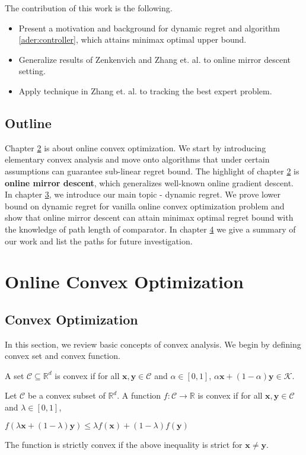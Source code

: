 \documentclass[12pt, a4paper]{report}
\begin{document}
The contribution of this work is the following.
\begin{itemize}
    \item Present a motivation and background for dynamic regret and algorithm \ref{ader:controller}, which attains minimax optimal upper bound. 
    \item Generalize results of Zenkenvich \cite{Zinkevich2003OnlineCP} and Zhang et. al. \cite{Zhang2018AdaptiveOL} to online mirror descent setting.
    \item Apply technique in Zhang et. al. \cite{Zhang2018AdaptiveOL} to tracking the best expert problem.
\end{itemize}



\section{Outline}
Chapter \hyperref[Chap2]{2} is about online convex optimization. We start by introducing elementary convex analysis and move onto algorithms that under certain assumptions can guarantee sub-linear regret bound. The highlight of chapter \hyperref[Chap2]{2} is \textbf{online mirror descent}, which generalizes well-known online gradient descent. In chapter \hyperref[Chap3]{3}, we introduce our main topic - dynamic regret. We prove lower bound on dynamic regret for vanilla online convex optimization problem and show that online mirror descent can attain minimax optimal regret bound with the knowledge of path length of comparator.  
In chapter \hyperref[Chap4]{4} we give a summary of our work and list the paths for future investigation.

\chapter{Online Convex Optimization}
\label{Chap2}
\section{Convex Optimization}
In this section, we review basic concepts of convex analysis. We begin by defining convex set and convex function.
\begin{defn}
A set $ \mathcal{C} \subseteq \mathbb{R}^{d} $ is convex if for all $\mathbf{x}, \mathbf{y} \in \mathcal{C}$ and $\alpha \in [0, 1]$, $\alpha \mathbf{x} + (1 - \alpha) \mathbf{y} \in \mathcal{K}$.
\end{defn}
\begin{defn}
Let $\mathcal{C}$ be a convex subset of $\mathbb{R}^d$. A function $f: \mathcal{C} \rightarrow \mathbb{R}$ is convex if for all $\mathbf{x}, \mathbf{y} \in \mathcal{C}$ and $\lambda \in [0, 1]$,
\begin{center}
    $f(\lambda \mathbf{x} + (1-\lambda) \mathbf{y}) \leq \lambda f(\mathbf{x}) + (1 - \lambda)f(\mathbf{y})$
\end{center}
The function is strictly convex if the above inequality is strict for $\mathbf{x} \neq \mathbf{y}$.
\end{defn}
\end{document}
